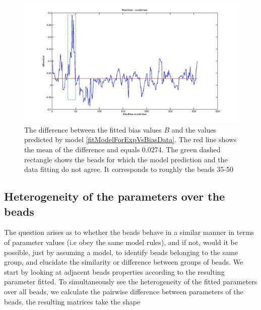 \documentclass[12pt]{paper}
\begin{document}
\begin{figure}[H]
\includegraphics[scale=0.15]{diffFittedBiasVsModelBias}
\caption{\scriptsize{The difference between the fitted bias values $B$ and the values predicted by model \ref{fitModelForExpVsBiasData}. The red line shows the mean of the difference and equals 0.0274. The green dashed rectangle shows the beads for which the model prediction and the data fitting do not agree. It corresponds to roughly the beads 35-50}}
\label{diffFittedBiasVsModelBias}
\end{figure}

\subsection{Heterogeneity of the parameters over the beads}
The question arises as to whether the beads behave in a similar manner in terms of parameter values (i.e obey the same model rules), and if not, would it be possible, just by assuming a model, to identify beads belonging to the same group, and elucidate the similarity or difference between groups of beads. 
We start by looking at adjacent beads properties according to the resulting parameter fitted.
To simultaneously see the heterogeneity of the fitted parameters over all beads, we calculate the pairwise difference between parameters of the beads. 
the resulting matrices take the shape
\end{document}
